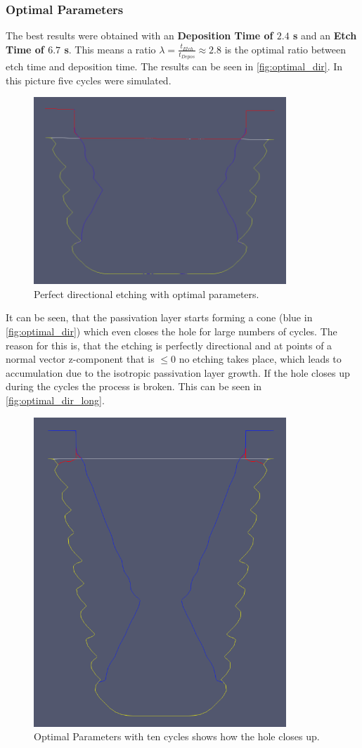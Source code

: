 \documentclass[12pt,a4paper]{article}
\begin{document}
 \subsubsection{Optimal Parameters}\label{sec:optimal_params}
 The best results were obtained with an \textbf{Deposition Time of $2.4$ s} and an \textbf{Etch Time of $6.7$ s}. This means a ratio $\lambda = \frac{t_{Etch}}{t_{Depos}} \approx 2.8$ is the optimal ratio between etch time and deposition time. The results can be seen in \autoref{fig:optimal_dir}. In this picture five cycles were simulated.
 \begin{figure}[H]
	\centering \includegraphics[width=9.5cm]{figures/optimal_dir.png}
	\caption{Perfect directional etching with optimal parameters.} 
    \label{fig:optimal_dir}
\end{figure}
It can be seen, that the passivation layer starts forming a cone (blue in \autoref{fig:optimal_dir}) which even closes the hole for large numbers of cycles. The reason for this is, that the etching is perfectly directional and at points of a normal vector z-component that is $\leq 0$ no etching takes place, which leads to accumulation due to the isotropic passivation layer growth. If the hole closes up during the cycles the process is broken. This can be seen in \autoref{fig:optimal_dir_long}.
 \begin{figure}[H]
	\centering \includegraphics[width=9.5cm]{figures/optimal_dir_long.png}
	\caption{Optimal Parameters with ten cycles shows how the hole closes up.} 
    \label{fig:optimal_dir_long}
\end{figure}
\end{document}
